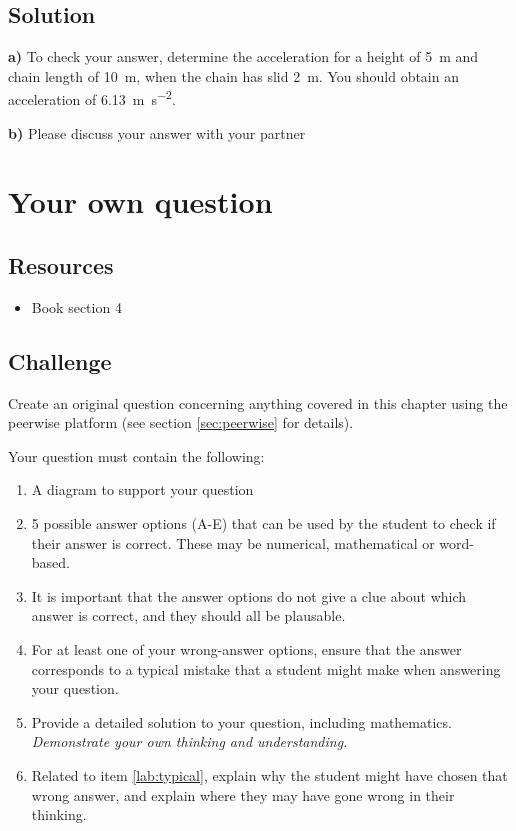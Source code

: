 \subsection*{Solution}
\textbf{a)} To check your answer, determine the acceleration for a height of \SI{5}{\meter} and chain length of \SI{10}{\meter}, when the chain has slid \SI{2}{m}. You should obtain an acceleration of \SI{6.13}{\meter\per\square\second}.

\textbf{b)} Please discuss your answer with your partner




\newpage
\section{Your own question}


\subsection*{Resources}
\begin{itemize}
    \item Book section 4
\end{itemize}

\subsection*{Challenge}
Create an original question concerning anything covered in this chapter using the peerwise platform (see section \ref{sec:peerwise} for details).

Your question must contain the following:
\begin{enumerate}
    \item A diagram to support your question
    \item 5 possible answer options (A-E) that can be used by the student to check if their answer is correct. These may be numerical, mathematical or word-based.
    \item It is important that the answer options do not give a clue about which answer is correct, and they should all be plausable.
    \item For at least one of your wrong-answer options, ensure that the answer corresponds to a typical mistake that a student might make when answering your question. \label{lab:typical}
    \item Provide a detailed solution to your question, including mathematics. \emph{Demonstrate your own thinking and understanding.}
    \item Related to item \ref{lab:typical}, explain why the student might have chosen that wrong answer, and explain where they may have gone wrong in their thinking.
\end{enumerate}




